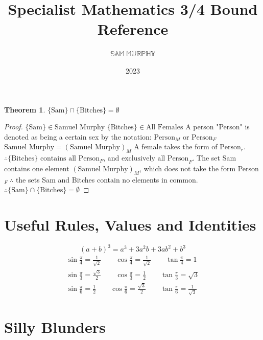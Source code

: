 \documentclass[a4paper,twoside]{article}
\title {Specialist Mathematics 3/4 Bound Reference}
\author {$\mathbb{SAM}\;\mathbb{MURPHY}$}
\date{2023}
\begin{document}
	\maketitle
	\newtheorem{bitchesTheorem}{Theorem}
	\begin{bitchesTheorem}
		$\{\text{Sam}\}\cap\{\text{Bitches}\}=\emptyset$
	\end{bitchesTheorem}
	\begin{proof}
		$\{\text{Sam}\}\in\text{Samuel Murphy}$\newline
		$\{\text{Bitches}\}\in\text{All Females}$\newline\newline
		A person "Person" is denoted as being a certain sex by the notation: $\text{Person}_M\text{ or Person}_F$\newline\newline
		$\text{Samuel Murphy}=(\text{Samuel Murphy})_M$\newline\newline
		A female takes the form of $\text{Person}_r$. $\therefore \{\text{Bitches}\}\text{ contains all Person}_F\text{, and exclusively all Person}_F$.\newline\newline
		The set {Sam} contains one element $(\text{Samuel Murphy})_M$, which does not take the form Person$_F\;\therefore$ the sets {Sam} and {Bitches} contain no elements in common.\newline
		$\therefore\{\text{Sam}\}\cap\{\text{Bitches}\}=\emptyset$
	\end{proof}
	\newpage
	\tableofcontents
	\newpage
	\section{Useful Rules, Values and Identities}
	\[
		(a+b)^3=a^3+3a^2b+3ab^2+b^3
	\]
	\begin{align*}
		\sin\frac{\pi}{4}=\frac{1}{\sqrt2} \qquad \cos\frac{\pi}{4}=\frac{1}{\sqrt2} \qquad \tan\frac{\pi}{4}=1 \\
		\sin\frac{\pi}{3}=\frac{\sqrt3}{2} \qquad \cos\frac{\pi}{3}=\frac{1}{2} \qquad \tan\frac{\pi}{3}=\sqrt3\\
		\sin\frac{\pi}{6}=\frac{1}{2} \qquad \cos\frac{\pi}{6}=\frac{\sqrt3}{2} \qquad \tan\frac{\pi}{6}=\frac{1}{\sqrt3}
	\end{align*}
	\newpage
	\section{Silly Blunders}
\end{document}
